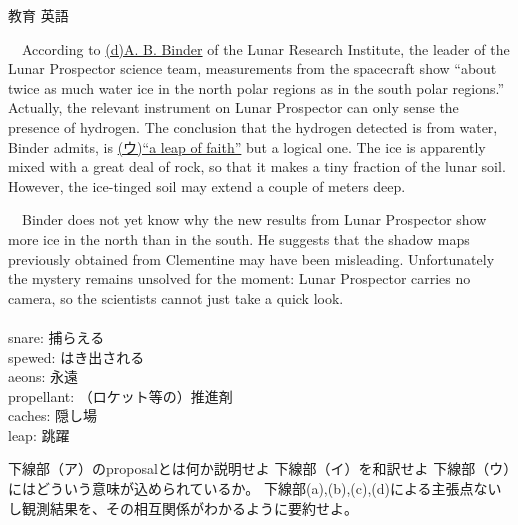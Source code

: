 \documentclass[fleqn]{jbook}
\begin{document}
\begin{question}{教育 英語}{}
\begin{subquestions}
　According to \underline{(d)A. B. Binder} of the Lunar Research Institute, the leader of the Lunar Prospector science team, measurements from the spacecraft show ``about twice as much water ice in the north polar regions as in the south polar regions.'' Actually, the relevant instrument on Lunar Prospector can only sense the presence of hydrogen. The conclusion that the hydrogen detected is from water, Binder admits, is \underline{(ウ)``a leap of faith''} but a logical one. The ice is apparently mixed with a great deal of rock, so that it makes a tiny fraction of the lunar soil. However, the ice-tinged soil may extend a couple of meters deep.

　Binder does not yet know why the new results from Lunar Prospector show more ice in the north than in the south. He suggests that the shadow maps previously obtained from Clementine may have been misleading. Unfortunately the mystery remains unsolved for the moment: Lunar Prospector carries no camera, so the scientists cannot just take a quick look.\\
\\
snare:  捕らえる\\
spewed:  はき出される\\
aeons:  永遠\\
propellant:  （ロケット等の）推進剤\\
caches:  隠し場\\
leap:  跳躍\\

\baselineskip=15pt

\begin{subsubquestions}
\SubSubQuestion
下線部（ア）のproposalとは何か説明せよ
\SubSubQuestion
下線部（イ）を和訳せよ
\SubSubQuestion
下線部（ウ）にはどういう意味が込められているか。
\SubSubQuestion
下線部(a),(b),(c),(d)による主張点ないし観測結果を、その相互関係がわかるように要約せよ。
\end{subsubquestions}


\end{subquestions}
\end{question}
\end{document}
